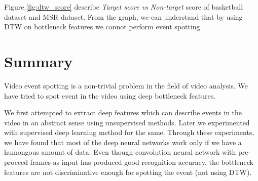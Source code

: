 Figure.\ref{fig:dtw_score} describe \textit{Target score vs Non-target} score of basketball dataset and MSR dataset. From the graph, we can understand that by using DTW on bottleneck features we cannot perform event spotting.

\section{Summary}

Video event spotting is a non-trivial problem in the field of video analysis. We have tried to spot event in the video using deep bottleneck features.

We first attempted to extract deep features which can describe events in the video in an abstract sense using unsupervised methods. Later we experimented with supervised deep learning method for the same. Through these experiments, we have found that most of the deep neural networks work only if we have a humongous amount of data. Even though convolution neural network with pre-proceed frames as input has produced good recognition accuracy, the bottleneck features are not discriminative enough for spotting the event (not using DTW).
